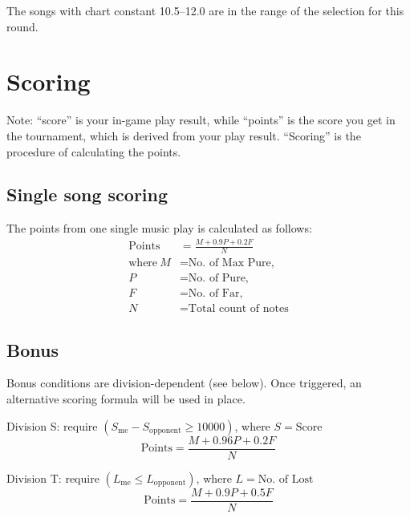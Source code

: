 \documentclass{article}
\newcommand{\alert}[1]{{\color{red} #1}}
\begin{document}
\alert{
	The songs with chart constant 10.5--12.0
	are in the range of the selection for this round.
}

\section{Scoring}  %

Note: ``score'' is your in-game play result,
while ``points'' is the score you get in the tournament,
which is derived from your play result.
``Scoring'' is the procedure of calculating the points.

\newcommand{\Points}{\text{Points}}

\subsection{Single song scoring}
The points from one single music play is calculated as follows:
\alert{
	\begin{align*}
		\Points        & = \frac{M + 0.9P + 0.2F}{N}   \\
		\text{where}~M & = \text{No.~of Max Pure,}     \\
		P              & = \text{No.~of Pure,}         \\
		F              & = \text{No.~of Far,}          \\
		N              & = \text{Total count of notes}
	\end{align*}
}

\subsection{Bonus}

Bonus conditions are division-dependent (see below).
Once triggered, an alternative scoring formula
will be used in place.  %

Division S: require $(S_\text{me} - S_\text{opponent} \geq \num[group-separator={,}]{10000})$, where $S = \text{Score}$
\alert{
	\begin{equation*}
		\Points = \frac{M + 0.96P + 0.2F}N
	\end{equation*}
}

Division T: require $(L_\text{me} \leq L_\text{opponent})$, where $L = \text{No.~of Lost}$
\alert{
	\begin{equation*}
		\Points = \frac{M + 0.9P + 0.5F}N
	\end{equation*}
}
\end{document}
